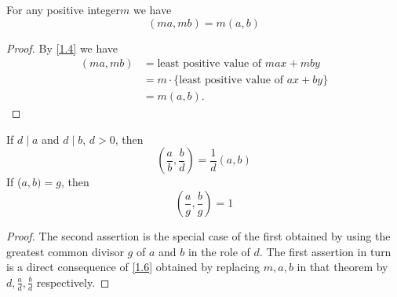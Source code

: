 \documentclass[11pt]{article}
\begin{document}
\begin{theorem}\label{1.6}
    For any positive integer\(m\) we have \[(ma, mb) = m(a, b)\]
\end{theorem}

\begin{proof}
    By \cref{1.4} we have
    \begin{align*}
        (ma, mb) & = \text{least positive value of } max + mby           \\
                 & = m \cdot \{\text{least positive value of } ax + by\} \\
                 & = m(a, b).
    \end{align*}
\end{proof}
\begin{theorem}\label{1.7}
    If \(d \mid a\) and \(d \mid b\), \(d > 0\), then \[(\frac{a}{b}, \frac{b}{d} ) = \frac{1}{d}(a, b)\]
    If (\(a, b) = g\), then \[(\frac{a}{g}, \frac{b}{g}) = 1\]
\end{theorem}

\begin{proof}
    The second assertion is the special case of the first obtained by using the greatest common divisor \(g\) of \(a\) and \(b\) in the role of \(d\). The first assertion in turn is a direct consequence of \cref{1.6} obtained by replacing \(m, a, b\) in that theorem by \(d, \frac{a}{d}, \frac{b}{d}\) respectively.
\end{proof}
\end{document}
